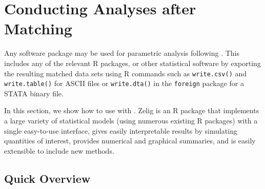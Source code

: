 \section{Conducting Analyses after Matching}
\label{sec:analysis}

Any software package may be used for parametric analysis following
\MatchIt.  This includes any of the relevant R packages, or other
statistical software by exporting the resulting matched data sets
using R commands such as {\tt write.csv()} and {\tt write.table()} for
ASCII files or {\tt write.dta()} in the {\tt foreign} package for a
STATA binary file.

In this section, we show how to use
 with \MatchIt.  Zelig
\citep{ImaKinLau06} is an R package that implements a large variety of
statistical models (using numerous existing R packages) with a single
easy-to-use interface, gives easily interpretable results by
simulating quantities of interest, provides numerical and graphical
summaries, and is easily extensible to include new methods.

\subsection{Quick Overview}

